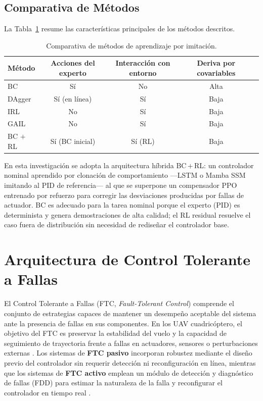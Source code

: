 \subsection{Comparativa de Métodos}

La Tabla~\ref{tab:il_comparativa} resume las características principales de los métodos descritos.

\begin{table}[h]
\centering
\caption{Comparativa de métodos de aprendizaje por imitación.}
\label{tab:il_comparativa}
\begin{tabular}{lcccc}
\hline
\textbf{Método} & \textbf{Acciones del experto} & \textbf{Interacción con entorno} & \textbf{Deriva por covariables} \\
\hline
BC        & Sí          & No          & Alta  \\
DAgger    & Sí (en línea) & Sí        & Baja  \\
IRL       & No          & Sí          & Baja  \\
GAIL      & No          & Sí          & Baja  \\
BC $+$ RL & Sí (BC inicial) & Sí (RL) & Baja  \\
\hline
\end{tabular}
\end{table}

En esta investigación se adopta la arquitectura híbrida BC\,$+$\,RL: un controlador nominal aprendido por clonación de comportamiento —LSTM o Mamba SSM imitando al PID de referencia— al que se superpone un compensador PPO entrenado por refuerzo para corregir las desviaciones producidas por fallas de actuador. BC es adecuado para la tarea nominal porque el experto (PID) es determinista y genera demostraciones de alta calidad; el RL residual resuelve el caso fuera de distribución sin necesidad de rediseñar el controlador base.


\section{Arquitectura de Control Tolerante a Fallas}

El Control Tolerante a Fallas (FTC, \textit{Fault-Tolerant Control}) comprende el conjunto de estrategias capaces de mantener un desempeño aceptable del sistema ante la presencia de fallas en sus componentes. En los UAV cuadricóptero, el objetivo del FTC es preservar la estabilidad del vuelo y la capacidad de seguimiento de trayectoria frente a fallas en actuadores, sensores o perturbaciones externas \cite{fdd2021survey}. Los sistemas de \textbf{FTC pasivo} incorporan robustez mediante el diseño previo del controlador sin requerir detección ni reconfiguración en línea, mientras que los sistemas de \textbf{FTC activo} emplean un módulo de detección y diagnóstico de fallas (FDD) para estimar la naturaleza de la falla y reconfigurar el controlador en tiempo real \cite{freddi2019, du2023, ahmadi2023}.

